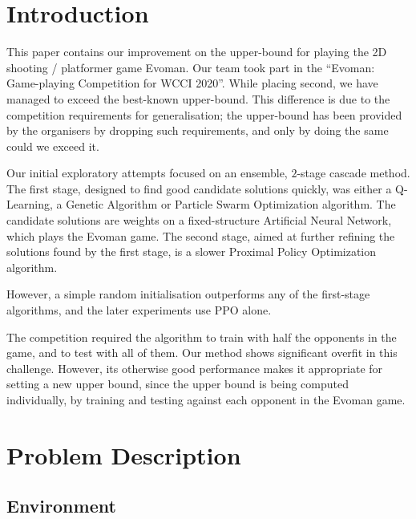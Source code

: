 \documentclass[conference]{IEEEtran}
\begin{document}
    \section{Introduction}\label{sec:introduction}
    This paper contains our improvement on the upper-bound for playing the 2D shooting / platformer game Evoman\cite{evoman}.
    Our team took part in the ``Evoman: Game-playing Competition for WCCI 2020''\cite{evoman_competition}. While placing second\cite{evoman_competition_results}, we have managed to exceed the best-known upper-bound. This difference is due to the competition requirements for generalisation; the upper-bound has been provided by the organisers by dropping such requirements, and only by doing the same could we exceed it.

    Our initial exploratory attempts focused on an ensemble, $2$-stage cascade method. The first stage, designed to find good candidate solutions quickly, was either a Q-Learning\cite{q_learning}, a Genetic Algorithm\cite{genetic_algorithm} or Particle Swarm Optimization\cite{pso} algorithm. The candidate solutions are weights on a fixed-structure Artificial Neural Network, which plays the Evoman game. The second stage, aimed at further refining the solutions found by the first stage, is a slower Proximal Policy Optimization\cite{ppo} algorithm.

    However, a simple random initialisation outperforms any of the first-stage algorithms, and the later experiments use PPO alone.

    The competition required the algorithm to train with half the opponents in the game, and to test with all of them. Our method shows significant overfit in this challenge. However, its otherwise good performance makes it appropriate for setting a new upper bound, since the upper bound is being computed individually, by training and testing against each opponent in the Evoman game.

    \section{Problem Description}\label{sec:problem-description}

    \subsection{Environment}\label{subsec:environment}
\end{document}
